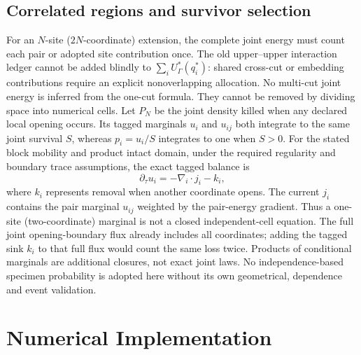 \documentclass[11pt]{article}
\begin{document}
\subsection{Correlated regions and survivor selection}
For an $N$-site ($2N$-coordinate) extension, the complete joint energy must
count each pair or adopted site contribution once. The old upper--upper
interaction ledger cannot be added blindly to $\sum_iU_\Gamma^*(q_i^*)$:
shared cross-cut or embedding contributions require an explicit nonoverlapping
allocation. No multi-cut joint energy is inferred from the one-cut formula.
They cannot be removed by dividing space into numerical cells.
Let $P_N$ be the joint density killed when any declared local opening occurs.
Its tagged marginals $u_i$ and $u_{ij}$ both integrate to the same joint survival
$S$, whereas $p_i=u_i/S$ integrates to one when $S>0$.
For the stated block mobility and product intact domain, under the required
regularity and boundary trace assumptions, the exact tagged balance is
\begin{equation}
 \partial_\tau u_i=-\nabla_i\!\cdot j_i-k_i,
\end{equation}
where $k_i$ represents removal when another coordinate opens. The current $j_i$
contains the pair marginal $u_{ij}$ weighted by the pair-energy gradient.
Thus a one-site (two-coordinate) marginal is not a closed independent-cell equation.
The full joint opening-boundary flux already includes all coordinates;
adding the tagged sink $k_i$ to that full flux would count the same loss twice.
Products of conditional marginals are additional closures, not exact joint laws.
No independence-based specimen probability is adopted here without its own
geometrical, dependence and event validation.

\section{Numerical Implementation}
\end{document}
